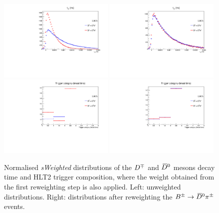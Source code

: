 \begin{figure}[t]
  \begin{center}
   \includegraphics[width=0.49\textwidth]{AA-Appdx-OSTaggers/figs/DTAU_BuVSBd_Unweighted.pdf}
   \includegraphics[width=0.49\textwidth]{AA-Appdx-OSTaggers/figs/DTAU_BuVSBd_Weighted.pdf} \\
   \includegraphics[width=0.49\textwidth]{AA-Appdx-OSTaggers/figs/TRIGCATB_BuVSBd_Unweighted.pdf}
   \includegraphics[width=0.49\textwidth]{AA-Appdx-OSTaggers/figs/TRIGCATB_BuVSBd_Weighted.pdf} \\
  \end{center}
  \vspace{-2mm}
  \caption{Normalised \emph{sWeighted} distributions of the $D^\mp$ and $\kern 0.2em\overline{\kern -0.2em D}{}^0$ mesons decay time and HLT2 trigger composition, where the weight obtained from the first reweighting step is also applied. Left: unweighted distributions. Right: distributions after reweighting the $B^\pm\rightarrow\kern 0.2em\overline{\kern -0.2em D}{}^0\pi^\pm$ events.}
  \label{fig:reweightingOSsecond}
\end{figure}

